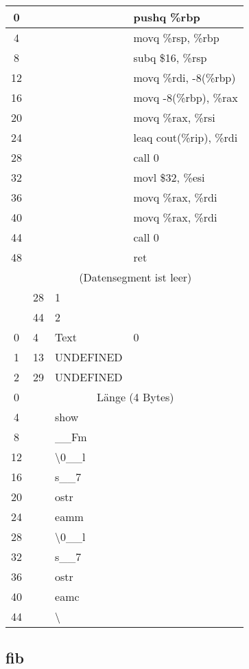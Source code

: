 \documentclass{ti2}
\begin{document}
\begin{tabular}{|c|l l l|}
	\hline
	0 & & & pushq	\%rbp\\
	\hline
	4 & & & movq	\%rsp, \%rbp\\
	\hline
	8 & & & subq	\$16, \%rsp\\
	\hline
	12 & & & movq	\%rdi, -8(\%rbp)\\
	\hline
	16 & & & movq	-8(\%rbp), \%rax\\
	\hline
	20 & & & movq	\%rax, \%rsi\\
	\hline
	24 & & & leaq	cout(\%rip), \%rdi\\
	\hline
	28 & & & call	0\\
	\hline
	32 & & & movl	\$32, \%esi\\
	\hline
	36 & & & movq	\%rax, \%rdi\\
	\hline
	40 & & & movq	\%rax, \%rdi\\
	\hline
	44 & & & call	0\\
	\hline
	48 & & & ret\\
	\hline
	& \multicolumn{3}{|c|}{(Datensegment ist leer)} \\
	\hline
	& 28 & 1 & \\
	\hline
	& 44 & 2 & \\
	\hline
	0 & 4 & Text & 0 \\
	\hline
	1 & 13 & UNDEFINED &  \\
	\hline
	2 & 29 & UNDEFINED &  \\
	\hline
	0 & \multicolumn{3}{|c|}{Länge (4 Bytes)} \\
	\hline
	4 &  & show &  \\
	\hline
	8 & & \_\_Fm & \\
	\hline
	12 & & \textbackslash0\_\_l & \\
	\hline
	16 & & s\_\_7 & \\
	\hline
	20 & & ostr & \\
	\hline
	24 & & eamm & \\
	\hline
	28 & & \textbackslash0\_\_l & \\
	\hline
	32 & & s\_\_7 & \\
	\hline
	36 & & ostr & \\
	\hline
	40 & & eamc & \\
	\hline
	44 & & \textbackslash & \\
	\hline
\end{tabular}	



\subsection{fib}
\end{document}
